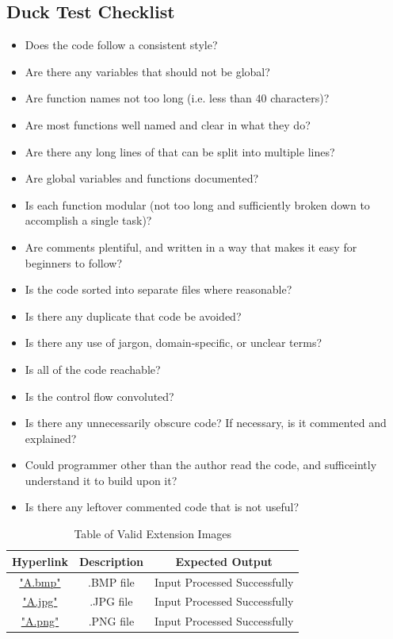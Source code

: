 \documentclass[12pt, titlepage]{article}
\begin{document}
\subsection{Duck Test Checklist} \label{checklist_duckTest}

\begin{itemize}
  \item{Does the code follow a consistent style?}
  \item{Are there any variables that should not be global?}
  \item{Are function names not too long (i.e. less than 40 characters)?}
  \item{Are most functions well named and clear in what they do?}
  \item{Are there any long lines of that can be split into multiple lines?}
  \item{Are global variables and functions documented?}
  \item{Is each function modular (not too long and sufficiently broken down to accomplish a single task)?}
  \item{Are comments plentiful, and written in a way that makes it easy for beginners to follow?}
  \item{Is the code sorted into separate files where reasonable?}
  \item{Is there any duplicate that code be avoided?}
  \item{Is there any use of jargon, domain-specific, or unclear terms?}
  \item{Is all of the code reachable?}
  \item{Is the control flow convoluted?}
  \item{Is there any unnecessarily obscure code? If necessary, is it commented and explained?}
  \item{Could programmer other than the author read the code, and sufficeintly understand it to build upon it?}
  \item{Is there any leftover commented code that is not useful?}
\end{itemize}

\begin{table}[h!]
  \centering
  \begin{tabular}{|c|c|c|}
    \hline
    \textbf{Hyperlink} & \textbf{Description} & \textbf{Expected Output} \\ \hline
    \hyperref[A.bmp]{"A.bmp"} & .BMP file & Input Processed Successfully \\ \hline
    \hyperref[A.jpg]{"A.jpg"} & .JPG file & Input Processed Successfully \\ \hline
    \hyperref[A.png]{"A.png"} & .PNG file & Input Processed Successfully \\ \hline
  \end{tabular}
  \caption{Table of Valid Extension Images}
  \label{table_ext}
\end{table}
\end{document}
